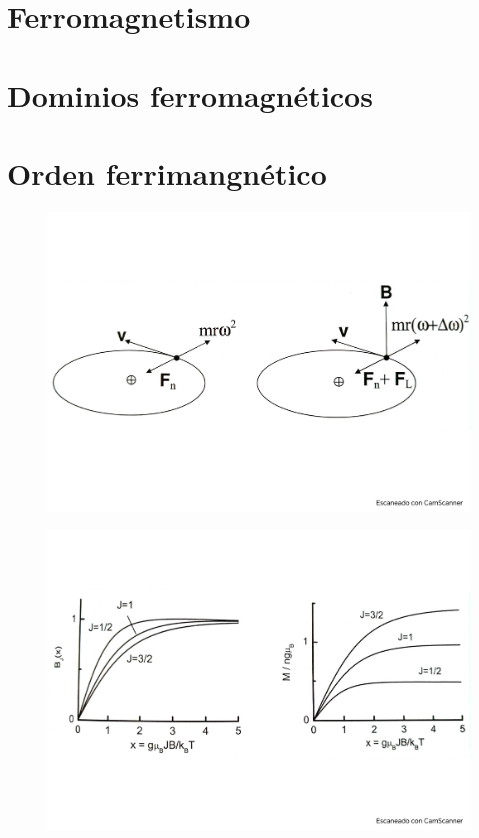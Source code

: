 \section{Ferromagnetismo}

\section{Dominios ferromagnéticos}

\section{Orden ferrimangnético}

\begin{figure}[h!] \centering
	\includegraphics[scale=0.5]{Cuerpo/Ch_10/Fotos libro 1.pdf}
	\caption{}
	\label{Fig:10-01}
\end{figure}
\begin{figure}[h!] \centering
	\includegraphics[scale=0.5]{Cuerpo/Ch_10/Fotos libro 2.pdf}
	\caption{}
	\label{Fig:10-02}
\end{figure}
